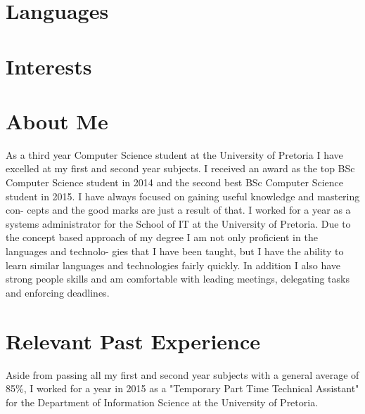 \documentclass[11pt,a4paper,sans]{moderncv} %
\begin{document}
\section{Languages}



\section{Interests}
\renewcommand{\listitemsymbol}{-~} %

\section{About Me}
As a third year Computer Science student at the University of Pretoria I have excelled at my first and second
year subjects. I received an award as the top BSc Computer Science student in 2014 and the second best BSc
Computer Science student in 2015. I have always focused on gaining useful knowledge and mastering con-
cepts and the good marks are just a result of that. I worked for a year as a systems administrator for the School
of IT at the University of Pretoria.
Due to the concept based approach of my degree I am not only proficient in the languages and technolo-
gies that I have been taught, but I have the ability to learn similar languages and technologies fairly quickly.
In addition I also have strong people skills and am comfortable with leading meetings, delegating tasks and
enforcing deadlines.

\section{Relevant Past Experience}
Aside from passing all my first and second year subjects with a general average of 85\%,
I worked for a year in 2015 as a "Temporary Part Time Technical Assistant" for the Department of Information Science
at the University of Pretoria.
\end{document}
